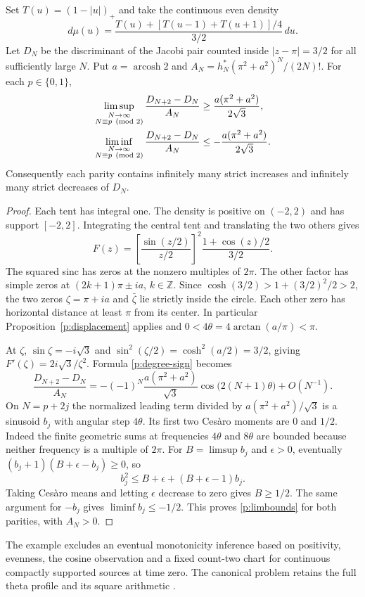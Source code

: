 \begin{theorem}
\label{p:oscillation}
Set \(T(u)=(1-|u|)_+\) and take the continuous even density
\begin{equation}
 d\mu(u)=\frac{T(u)+[T(u-1)+T(u+1)]/4}{3/2}\,du .
 \label{p:density}
\end{equation}
Let \(D_N\) be the discriminant of the Jacobi pair counted inside
\(\lvert z-\pi\rvert=3/2\) for all sufficiently large \(N\). Put
\(a=\operatorname{arcosh}2\) and
\(A_N=h_N^*(\pi^2+a^2)^N/(2N)!\). For each \(p\in\{0,1\}\),
\begin{align}
 \limsup_{\substack{N\to\infty\\N\equiv p\pmod 2}}
     \frac{D_{N+2}-D_N}{A_N}
   &\ge \frac{a(\pi^2+a^2)}{2\sqrt{3}}, \notag\\
 \liminf_{\substack{N\to\infty\\N\equiv p\pmod 2}}
     \frac{D_{N+2}-D_N}{A_N}
   &\le -\frac{a(\pi^2+a^2)}{2\sqrt{3}} .
 \label{p:limbounds}
\end{align}
Consequently each parity contains infinitely many strict increases
and infinitely many strict decreases of \(D_N\).
\end{theorem}

\begin{proof}
Each tent has integral one. The density is positive on \((-2,2)\)
and has support \([-2,2]\). Integrating the central tent and
translating the two others gives
\[
 F(z)=\left[\frac{\sin(z/2)}{z/2}\right]^2
       \frac{1+\cos(z)/2}{3/2}.
\]
The squared sinc has zeros at the nonzero multiples of \(2\pi\).
The other factor has simple zeros at \((2k+1)\pi\pm ia\),
\(k\in\mathbb Z\). Since
\(\cosh(3/2)>1+(3/2)^2/2>2\), the two zeros
\(\zeta=\pi+ia\) and \(\bar\zeta\) lie strictly inside the
circle. Each other zero has horizontal distance at least \(\pi\)
from its center. In particular Proposition~\ref{p:displacement}
applies and \(0<4\theta=4\arctan(a/\pi)<\pi\).

At \(\zeta\), \(\sin\zeta=-i\sqrt{3}\) and
\(\sin^2(\zeta/2)=\cosh^2(a/2)=3/2\), giving
\(F'(\zeta)=2i\sqrt{3}/\zeta^2\). Formula \eqref{p:degree-sign}
becomes
\[
 \frac{D_{N+2}-D_N}{A_N}
   =-(-1)^N\frac{a(\pi^2+a^2)}{\sqrt{3}}
      \cos\bigl(2(N+1)\theta\bigr)+O(N^{-1}).
\]
On \(N=p+2j\) the normalized leading term divided by
\(a(\pi^2+a^2)/\sqrt{3}\) is a sinusoid \(b_j\) with angular step
\(4\theta\). Its first two Ces\`aro moments are \(0\) and \(1/2\).
Indeed the finite geometric sums at frequencies \(4\theta\) and
\(8\theta\) are bounded because neither frequency is a multiple of
\(2\pi\). For \(B=\limsup b_j\) and \(\epsilon>0\), eventually
\((b_j+1)(B+\epsilon-b_j)\ge0\), so
\[
 b_j^2\le B+\epsilon+(B+\epsilon-1)b_j .
\]
Taking Ces\`aro means and letting \(\epsilon\) decrease to zero
gives \(B\ge1/2\). The same argument for \(-b_j\) gives
\(\liminf b_j\le-1/2\). This proves \eqref{p:limbounds}
for both parities, with \(A_N>0\).
\end{proof}

The example excludes an eventual monotonicity inference based on
positivity, evenness, the cosine observation and a fixed count-two
chart for continuous compactly supported sources at time zero. The
canonical problem retains the full theta profile and its square
arithmetic \cite[\S 1.2, Eq.~(1.1)]{agc}.
